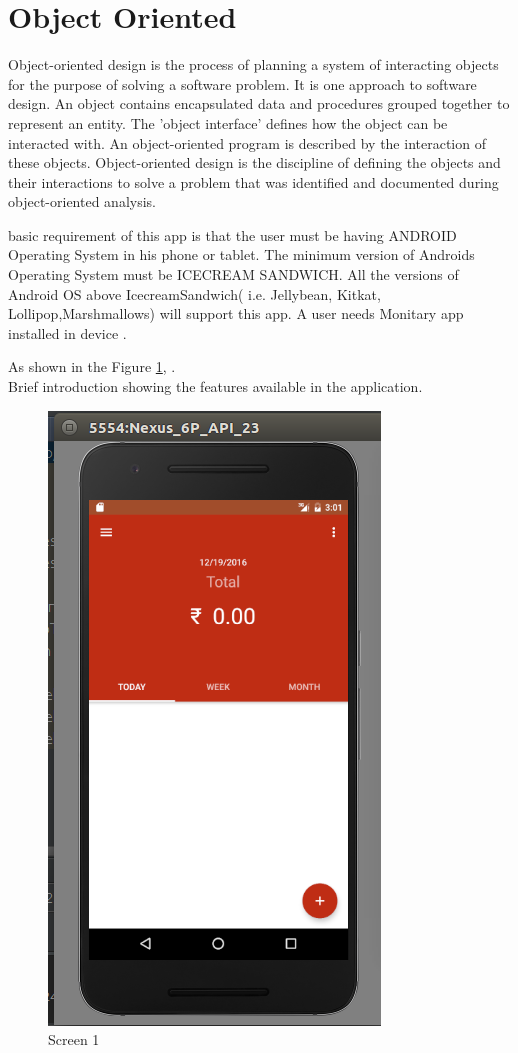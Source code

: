 
\section{Object Oriented}

Object-oriented design is the process of planning a system of interacting objects for the purpose of solving a software problem. It is one approach to software design. An object contains encapsulated data and procedures grouped together to represent an entity. The 'object interface' defines how the object can be interacted with. An object-oriented program is described by the interaction of these objects. Object-oriented design is the discipline of defining the objects and their interactions to solve a problem that was identified and documented during object-oriented analysis.

\iffalse
 basic requirement of this app is that the user must be having ANDROID
Operating System in his phone or tablet. The minimum version of Androids Operating
System must be ICECREAM SANDWICH. All the versions of Android OS above
IcecreamSandwich( i.e. Jellybean, Kitkat, Lollipop,Marshmallows) will support this
app. A user needs Monitary app installed in device .


\noindent As shown in the Figure \ref{fig:1}, .\\Brief introduction showing the features available in the application.

\begin{figure}[ht]
\centering
\includegraphics[scale=0.5]{images/s1.png}
\caption{Screen 1}
\label{fig:1}
\end{figure}

